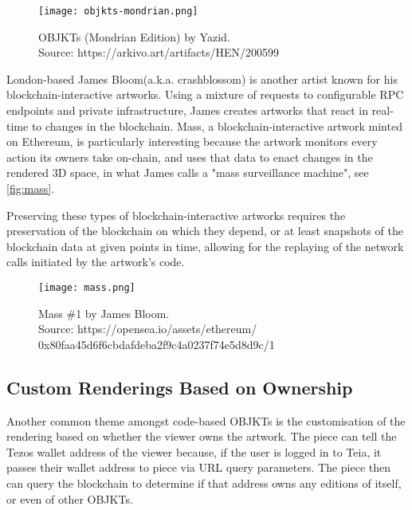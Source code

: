 
\begin{figure}[h]
    \centering
    \captionsetup{justification=centering}
    \texttt{[image: objkts-mondrian.png]}
    \captionsetup{justification=centering}
    \caption[OBJKTs (Mondrian Edition) by Yazid]{OBJKTs (Mondrian Edition) by Yazid. \\ Source: https://arkivo.art/artifacts/HEN/200599}
    \label{fig:mondrian}
\end{figure}

London-based James Bloom\footnotemark[6] (a.k.a. crashblossom) is another artist known for his blockchain-interactive artworks. Using a mixture of requests to configurable RPC endpoints and private infrastructure, James creates artworks that react in real-time to changes in the blockchain. Mass, a blockchain-interactive artwork minted on Ethereum, is particularly interesting because the artwork monitors every action its owners take on-chain, and uses that data to enact changes in the rendered 3D space, in what James calls a "mass surveillance machine", see \autoref{fig:mass}.

Preserving these types of blockchain-interactive artworks requires the preservation of the blockchain on which they depend, or at least snapshots of the blockchain data at given points in time, allowing for the replaying of the network calls initiated by the artwork's code.


\begin{figure}[h]
    \centering
    \captionsetup{justification=centering}
    \texttt{[image: mass.png]}
    \captionsetup{justification=centering}
    \caption[Mass \#1 by James Bloom]{Mass \#1 by James Bloom. \\ Source: https://opensea.io/assets/ethereum/ \\
    0x80faa45d6f6cbdafdeba2f9c4a0237f74e5d8d9c/1}
    \label{fig:mass}
\end{figure}


\subsection{Custom Renderings Based on Ownership}

Another common theme amongst code-based OBJKTs is the customisation of the rendering based on whether the viewer owns the artwork. The piece can tell the Tezos wallet address of the viewer because, if the user is logged in to Teia, it passes their wallet address to piece via URL query parameters. The piece then can query the blockchain to determine if that address owns any editions of itself, or even of other OBJKTs.

